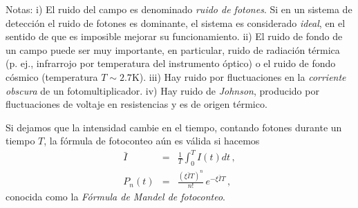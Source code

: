 \documentclass[twocolumn,aps,eqsecnum,showkeys,amsmath]{revtex4}
\begin{document}
Notas: i) El ruido del campo es denominado \textit{ruido de fotones}. 
Si en un sistema de detecci\'on el ruido de fotones es dominante, 
el sistema es considerado \textit{ideal}, en el sentido de que es 
imposible mejorar su funcionamiento. ii) El ruido de fondo de un campo 
puede ser muy importante, en particular, ruido de radiaci\'on t\'ermica 
(p. ej., infrarrojo por temperatura del instrumento \'optico) o el ruido 
de fondo c\'osmico (temperatura $T \sim 2.7$K). iii) Hay ruido por 
fluctuaciones en la \textit{corriente obscura} de un fotomultiplicador. 
iv) Hay ruido de \textit{Johnson}, producido por fluctuaciones de 
voltaje en resistencias y es de origen t\'ermico.

Si dejamos que la intensidad cambie en el tiempo, contando fotones 
durante un tiempo $T$, la f\'ormula de fotoconteo a\'un es v\'alida si 
hacemos 
%
\begin{subequations}
\begin{eqnarray}
\bar{I} &=& \frac{1}{T} \int_0^T I(t) dt \,, \\
P_n(t) &=& \frac{(\xi \bar{I} T)^n}{n!} \,e^{-\xi \bar{I} T}  	\,, 
	\label{eq:MamdelPhotocount}
\end{eqnarray}
\end{subequations}
conocida como la \textit{F\'ormula de Mandel de fotoconteo}. 
\end{document}
